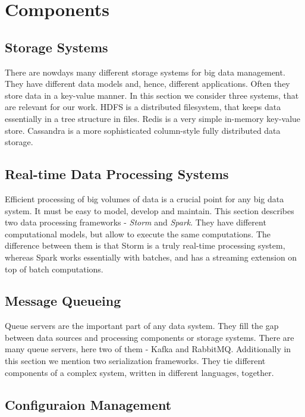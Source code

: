 \chapter{Components}
\label{chap:components}

\section{Storage Systems}

There are nowdays many different storage systems for big data management.
They have different data models and, hence, different applications.
Often they store data in a key-value manner.
In this section we consider three systems, that are relevant for our work.
HDFS is a distributed filesystem, that keeps data essentially in a tree structure in files.
Redis is a very simple in-memory key-value store.
Cassandra is a more sophisticated column-style fully distributed data storage.





\section{Real-time Data Processing Systems}

Efficient processing of big volumes of data is a crucial point for any big data system.
It must be easy to model, develop and maintain.
This section describes two data processing frameworks - \textit{Storm} and \textit{Spark}.
They have different computational models, but allow to execute the same computations.
The difference between them is that Storm is a truly real-time processing system, whereas Spark works essentially with batches, and has a streaming extension on top of batch computations.




\section{Message Queueing}

Queue servers are the important part of any data system.
They fill the gap between data sources and processing components or storage systems.
There are many queue servers, here two of them - Kafka and RabbitMQ.
Additionally in this section we mention two serialization frameworks.
They tie different components of a complex system, written in different languages, together.






\section{Configuraion Management}

